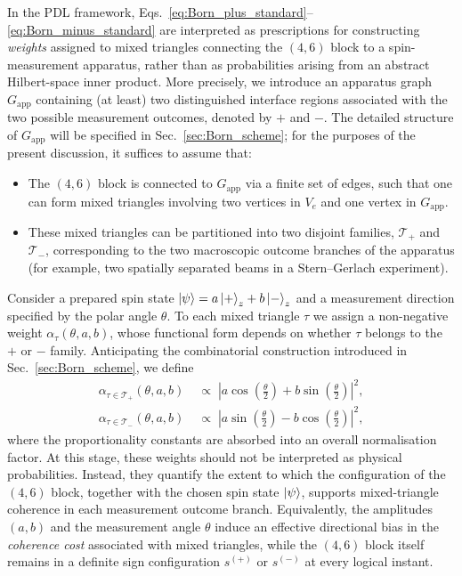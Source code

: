 \documentclass[11pt,a4paper]{article}
\numberwithin{equation}{section}
\begin{document}
In the PDL framework, Eqs.~\eqref{eq:Born_plus_standard}--\eqref{eq:Born_minus_standard} are interpreted as prescriptions for constructing \emph{weights} assigned to mixed triangles connecting the $(4,6)$ block to a spin-measurement apparatus, rather than as probabilities arising from an abstract Hilbert-space inner product. More precisely, we introduce an apparatus graph $G_{\mathrm{app}}$ containing (at least) two distinguished interface regions associated with the two possible measurement outcomes, denoted by $+$ and $-$. The detailed structure of $G_{\mathrm{app}}$ will be specified in Sec.~\ref{sec:Born_scheme}; for the purposes of the present discussion, it suffices to assume that:
\begin{itemize}
  \item[(i)] The $(4,6)$ block is connected to $G_{\mathrm{app}}$ via a finite set of edges, such that one can form mixed triangles involving two vertices in $V_{e}$ and one vertex in $G_{\mathrm{app}}$.
  \item[(ii)] These mixed triangles can be partitioned into two disjoint families, $\mathcal{T}_+$ and $\mathcal{T}_-$, corresponding to the two macroscopic outcome branches of the apparatus (for example, two spatially separated beams in a Stern--Gerlach experiment).
\end{itemize}

Consider a prepared spin state $\ket{\psi} = a\ket{+}_z + b\ket{-}_z$ and a measurement direction specified by the polar angle $\theta$. To each mixed triangle $\tau$ we assign a non-negative weight $\alpha_\tau(\theta,a,b)$, whose functional form depends on whether $\tau$ belongs to the $+$ or $-$ family. Anticipating the combinatorial construction introduced in Sec.~\ref{sec:Born_scheme}, we define
\begin{align}
  \alpha_{\tau\in \mathcal{T}_+}(\theta,a,b)
  &\;\propto\;
  \left|a\cos\left(\tfrac{\theta}{2}\right) + b\sin\left(\tfrac{\theta}{2}\right)\right|^2,
  \label{eq:alpha_plus_def}\\[0.5em]
  \alpha_{\tau\in \mathcal{T}_-}(\theta,a,b)
  &\;\propto\;
  \left|a\sin\left(\tfrac{\theta}{2}\right) - b\cos\left(\tfrac{\theta}{2}\right)\right|^2,
  \label{eq:alpha_minus_def}
\end{align}
where the proportionality constants are absorbed into an overall normalisation factor. At this stage, these weights should not be interpreted as physical probabilities. Instead, they quantify the extent to which the configuration of the $(4,6)$ block, together with the chosen spin state $\ket{\psi}$, supports mixed-triangle coherence in each measurement outcome branch. Equivalently, the amplitudes $(a,b)$ and the measurement angle $\theta$ induce an effective directional bias in the \emph{coherence cost} associated with mixed triangles, while the $(4,6)$ block itself remains in a definite sign configuration $s^{(+)}$ or $s^{(-)}$ at every logical instant.
\end{document}

